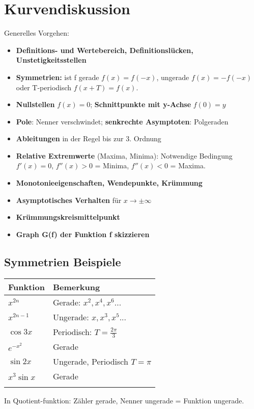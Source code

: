 \documentclass[../main.tex]{subfiles}
\begin{document}
\section{Kurvendiskussion}
Generelles Vorgehen:
\begin{itemize}
    \item \textbf{Definitions- und Wertebereich, Definitionslücken, \\ Unstetigkeitsstellen}
    \item \textbf{Symmetrien:} ist f gerade $f(x)=f(-x)$, ungerade $f(x)=-f(-x)$ oder T-periodisch $f(x+T) = f(x)$.
    \item \textbf{Nullstellen} $f(x)=0$; \textbf{Schnittpunkte mit y-Achse} $f(0) = y$
    \item \textbf{Pole}: Nenner verschwindet; \textbf{senkrechte Asymptoten}: Polgeraden
    \item \textbf{Ableitungen} in der Regel bis zur 3. Ordnung
    \item \textbf{Relative Extremwerte} (Maxima, Minima): Notwendige Bedingung \\ $f'(x)=0$, $f''(x)>0$ = Minima, $f''(x)<0$ = Maxima.
    \item \textbf{Monotonieeigenschaften, Wendepunkte, Krümmung}
    \item \textbf{Asymptotisches Verhalten} für $x \to \pm \infty$
    \item \textbf{Krümmungskreismittelpunkt}
    \item \textbf{Graph G(f) der Funktion f skizzieren}
\end{itemize}

\subsection{Symmetrien Beispiele}
\begin{tabularx}{1.0\textwidth} { 
    >{\centering\arraybackslash}X 
    >{\centering\arraybackslash}X  }
    \hline
    Funktion & Bemerkung \\ [7pt]
    \hline
    $x^{2n}$ & Gerade: $x^2, x^4, x^6$... \\ [7pt]
    $x^{2n-1}$ & Ungerade: $x, x^3, x^5$...   \\ [7pt]
    $\cos 3x$ & Periodisch: $T=\frac{2\pi}{3}$ \\ [7pt]
    $e^{-x^2}$ & Gerade \\ [7pt]
    $\sin 2x$ & Ungerade, Periodisch $T=\pi$ \\ [7pt]
    $x^3\sin x$ & Gerade \\ [7pt]
    &
\end{tabularx}
In Quotient-funktion: Zähler gerade, Nenner ungerade = Funktion ungerade.
\end{document}
